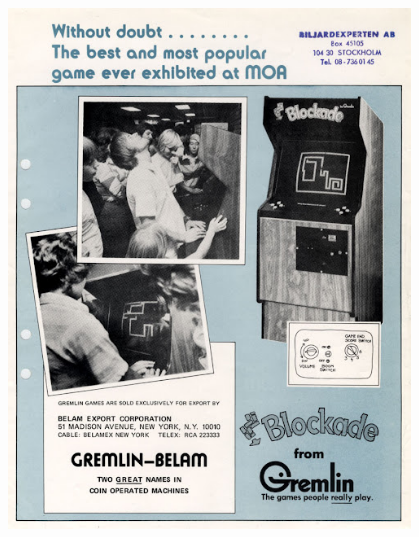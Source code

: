 \documentclass[10pt]{beamer}
\begin{document}
\begin{frame}
\begin{columns}[T]
\begin{column}{0.70\textwidth}
\end{column}
\begin{column}{0.25\textwidth}
\begin{figure}
\centering
\vspace{-1cm}\hspace{-0.76cm}
\includegraphics[width=1.3\textwidth]{blockade.jpg}
\end{figure}


\end{column}
\end{columns}
\end{frame}
\end{document}
